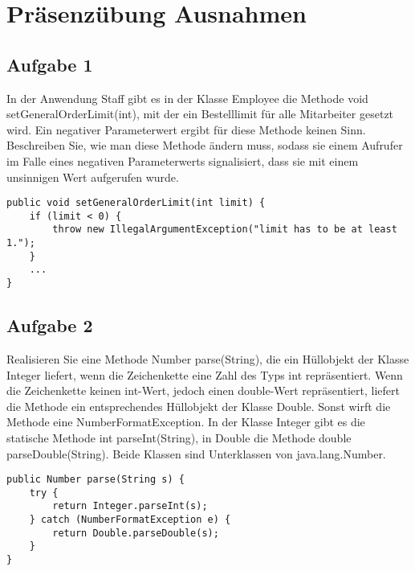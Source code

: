 \chapter{Präsenzübung Ausnahmen}

\section{Aufgabe 1}
In der Anwendung Staff gibt es in der Klasse Employee die Methode void setGeneralOrderLimit(int),
mit der ein Bestelllimit für alle Mitarbeiter gesetzt wird. Ein negativer Parameterwert ergibt für diese
Methode keinen Sinn.
Beschreiben Sie, wie man diese Methode ändern muss, sodass sie einem Aufrufer im Falle eines
negativen Parameterwerts signalisiert, dass sie mit einem unsinnigen Wert aufgerufen wurde.

\begin{lstlisting}
public void setGeneralOrderLimit(int limit) {
    if (limit < 0) {
        throw new IllegalArgumentException("limit has to be at least 1.");
    }
    ...
}
\end{lstlisting}

\section{Aufgabe 2}
Realisieren Sie eine Methode Number parse(String), die ein Hüllobjekt der Klasse Integer
liefert, wenn die Zeichenkette eine Zahl des Typs int repräsentiert. Wenn die Zeichenkette keinen
int-Wert, jedoch einen double-Wert repräsentiert, liefert die Methode ein entsprechendes Hüllobjekt der Klasse Double. Sonst wirft die Methode eine NumberFormatException.
In der Klasse Integer gibt es die statische Methode int parseInt(String), in Double die Methode double parseDouble(String). Beide Klassen sind Unterklassen von java.lang.Number.

\begin{lstlisting}
public Number parse(String s) {
    try {
        return Integer.parseInt(s);
    } catch (NumberFormatException e) {
        return Double.parseDouble(s);
    }
}
\end{lstlisting}